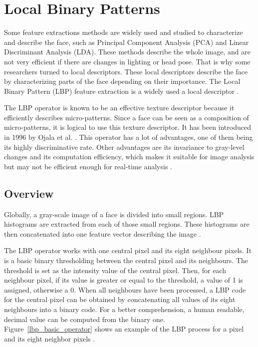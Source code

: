 \chapter{Local Binary Patterns}
\label{chap:lbp}

\noindent Some feature extractions methods are widely used and studied to characterize and describe the face, such as Principal Component Analysis (PCA) and Linear Discriminant Analysis (LDA). These methods describe the whole image, and are not very efficient if there are changes in lighting or head pose. That is why some researchers turned to local descriptors. These local descriptors describe the face by characterizing parts of the face depending on their importance. The Local Binary Pattern (LBP) feature extraction is a widely used a local descriptor \cite{AHO06}.
\newline

\noindent The LBP operator is known to be an effective texture descriptor because it efficiently describes micro-patterns. Since a face can be seen as a composition of micro-patterns, it is logical to use this texture descriptor. It has been introduced in 1996 by Ojala et al. \cite{OJA96}. This operator has a lot of advantages, one of them being its highly discriminative rate. Other advantages are its invariance to gray-level changes and its computation efficiency, which makes it suitable for image analysis but may not be efficient enough for real-time analysis \cite{AHO06}.
\newline

\section{Overview}

\vspace{\baselineskip}
\noindent Globally, a gray-scale image of a face is divided into small regions. LBP histograms are extracted from each of those small regions. These histograms are then concatenated into one feature vector describing the image \cite{JUL07}.
\newline

\noindent The LBP operator works with one central pixel and its eight neighbour pixels. It is a basic binary thresholding between the central pixel and its neighbours. The threshold is set as the intensity value of the central pixel. Then, for each neighbour pixel, if its value is greater or equal to the threshold, a value of 1 is assigned, otherwise a 0. When all neighbours have been processed, a LBP code for the central pixel can be obtained by concatenating all values of its eight neighbours into a binary code. For a better comprehension, a human readable, decimal value can be computed from the binary one. Figure~\ref{lbp_basic_operator} shows an example of the LBP process for a pixel and its eight neighbor pixels \cite{JUL07}.
\newline

